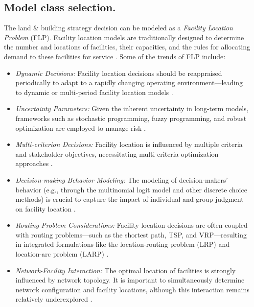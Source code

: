 \documentclass[pdflatex,sn-mathphys-num]{sn-jnl}
\theoremstyle{thmstyleone}
\theoremstyle{thmstyletwo}
\theoremstyle{thmstylethree}
\begin{document}
\subsection{Model class selection.}

The land \& building strategy decision can be modeled as a \textit{Facility Location Problem} (FLP). 
Facility location models are traditionally designed to determine the number and locations of facilities, their capacities, and the rules for allocating demand to these facilities for service \cite{church2018location,drezner1995survey,drezner2002facility,eiselt2004decision,eiselt2011foundations,eiselt2015applications,farahani2009facility,farahani2019urban}. Some of the trends of FLP include:

\begin{itemize}
    \item \emph{Dynamic Decisions:} Facility location decisions should be reappraised periodically to adapt to a rapidly changing operating environment—leading to dynamic or multi-period facility location models \cite{arabani2012facility}.
    \item \emph{Uncertainty Parameters:} Given the inherent uncertainty in long-term models, frameworks such as stochastic programming, fuzzy programming, and robust optimization are employed to manage risk \cite{correia2015uncertainty,snyder2006facility}.
    \item \emph{Multi-criterion Decisions:} Facility location is influenced by multiple criteria and stakeholder objectives, necessitating multi-criteria optimization approaches \cite{farahani2010multiple}.
    \item \emph{Decision-making Behavior Modeling:} The modeling of decision-makers’ behavior (e.g., through the multinomial logit model and other discrete choice methods) is crucial to capture the impact of individual and group judgment on facility location \cite{mcfadden1974conditional,haase2014comparison,mogale2018bounded}.
    \item \emph{Routing Problem Considerations:} Facility location decisions are often coupled with routing problems—such as the shortest path, TSP, and VRP—resulting in integrated formulations like the location-routing problem (LRP) and location-arc problem (LARP) \cite{daskin2013network}.
    \item \emph{Network-Facility Interaction:} The optimal location of facilities is strongly influenced by network topology. It is important to simultaneously determine network configuration and facility locations, although this interaction remains relatively underexplored \cite{peeters1995effect,daskin2003location}.
\end{itemize}
\end{document}
